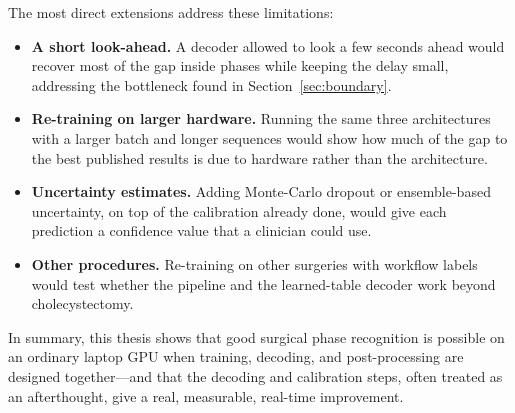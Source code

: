 The most direct extensions address these limitations:

\begin{itemize}
    \item \textbf{A short look-ahead.} A decoder allowed to look a few seconds ahead would recover most of the gap inside phases while keeping the delay small, addressing the bottleneck found in Section~\ref{sec:boundary}.
    \item \textbf{Re-training on larger hardware.} Running the same three architectures with a larger batch and longer sequences would show how much of the gap to the best published results is due to hardware rather than the architecture.
    \item \textbf{Uncertainty estimates.} Adding Monte-Carlo dropout or ensemble-based uncertainty, on top of the calibration already done, would give each prediction a confidence value that a clinician could use.
    \item \textbf{Other procedures.} Re-training on other surgeries with workflow labels would test whether the pipeline and the learned-table decoder work beyond cholecystectomy.
\end{itemize}

In summary, this thesis shows that good surgical phase recognition is possible on an ordinary laptop GPU when training, decoding, and post-processing are designed together---and that the decoding and calibration steps, often treated as an afterthought, give a real, measurable, real-time improvement.
